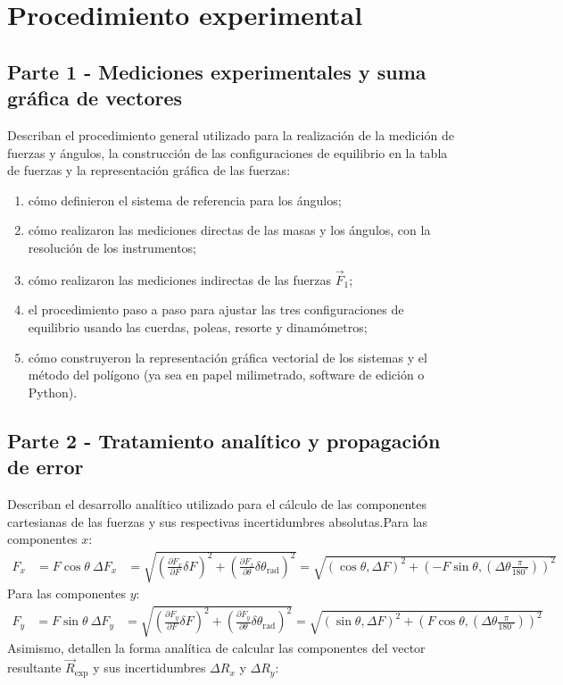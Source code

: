 \section{Procedimiento experimental}\subsection{Parte 1 - Mediciones experimentales y suma gráfica de vectores} \label{Procedimiento-Parte-1}Describan el procedimiento general utilizado para la realización de la medición de fuerzas y ángulos, la construcción de las configuraciones de equilibrio en la tabla de fuerzas y la representación gráfica de las fuerzas:\begin{enumerate}[label=\alph*)]
\item cómo definieron el sistema de referencia para los ángulos;
\item cómo realizaron las mediciones directas de las masas y los ángulos, con la resolución de los instrumentos;
\item cómo realizaron las mediciones indirectas de las fuerzas $\vec{F}_1$;
\item el procedimiento paso a paso para ajustar las tres configuraciones de equilibrio usando las cuerdas, poleas, resorte y dinamómetros;
\item cómo construyeron la representación gráfica vectorial de los sistemas y el método del polígono (ya sea en papel milimetrado, software de edición o Python).
\end{enumerate}\subsection{Parte 2 - Tratamiento analítico y propagación de error} \label{Procedimiento-Parte-2}Describan el desarrollo analítico utilizado para el cálculo de las componentes cartesianas de las fuerzas y sus respectivas incertidumbres absolutas.Para las componentes $x$:
\begin{align*}
F_x &= F \cos\theta \
\Delta F_x &= \sqrt{\left(\frac{\partial F_x}{\partial F}\delta F\right)^2 + \left(\frac{\partial F_x}{\partial \theta}\delta \theta_{\text{rad}}\right)^2} = \sqrt{\left(\cos\theta , \Delta F\right)^2 + \left(-F\sin\theta , \left(\Delta \theta \frac{\pi}{180^\circ}\right)\right)^2}
\end{align*}Para las componentes $y$:
\begin{align*}
F_y &= F \sin\theta \
\Delta F_y &= \sqrt{\left(\frac{\partial F_y}{\partial F}\delta F\right)^2 + \left(\frac{\partial F_y}{\partial \theta}\delta \theta_{\text{rad}}\right)^2} = \sqrt{\left(\sin\theta , \Delta F\right)^2 + \left(F\cos\theta , \left(\Delta \theta \frac{\pi}{180^\circ}\right)\right)^2}
\end{align*}Asimismo, detallen la forma analítica de calcular las componentes del vector resultante $\vec{R}_{\text{exp}}$ y sus incertidumbres $\Delta R_x$ y $\Delta R_y$:
